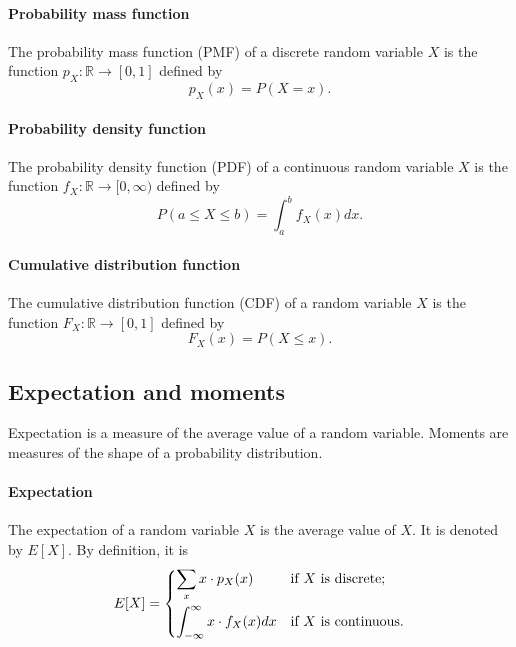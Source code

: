 \paragraph{Probability mass function}

The probability mass function (PMF) of a discrete random variable $X$ is the
function $p_X : \mathbb{R} \rightarrow [0, 1]$ defined by
\begin{equation}
  \label{eq:pmf}
  p_X(x) = P(X = x)\text{.}
\end{equation}

\paragraph{Probability density function}

The probability density function (PDF) of a continuous random variable $X$ is the
function $f_X : \mathbb{R} \rightarrow [0, \infty)$ defined by
\begin{equation}
  \label{eq:pdf}
  P(a \leq X \leq b) = \int_a^b f_X(x) dx\text{.}
\end{equation}

\paragraph{Cumulative distribution function}

The cumulative distribution function (CDF) of a random variable $X$ is the function
$F_X : \mathbb{R} \rightarrow [0, 1]$ defined by
\begin{equation}
  \label{eq:cdf}
  F_X(x) = P(X \leq x)\text{.}
\end{equation}

\subsection{Expectation and moments}

Expectation is a measure of the average value of a random variable.  Moments are
measures of the shape of a probability distribution.

\paragraph{Expectation}  The expectation of a random variable $X$ is the average
value of $X$.  It is denoted by $E[X]$.  By definition, it is
\begin{equation}
  \label{eq:expectation}
  E[X] = \begin{dcases}
    \sum_{x} x \cdot p_X(x) & \text{if $X$ is discrete; } \\
    \int_{-\infty}^{\infty} x \cdot f_X(x) dx & \text{if $X$ is continuous.}
  \end{dcases}
\end{equation}

